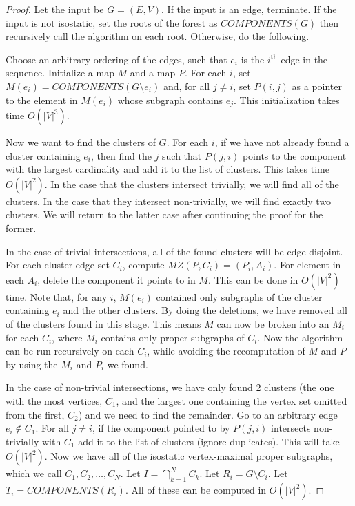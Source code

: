 \begin{proof}
    Let the input be $G=(E,V)$. If the input is an edge, terminate. If the input is not isostatic, set the roots of the forest as $COMPONENTS(G)$ then recursively call the algorithm on each root. Otherwise, do the following.

    Choose an arbitrary ordering of the edges, such that $e_i$ is the $i^\text{th}$ edge in the sequence.
    Initialize a map $M$ and a map $P$. For each $i$, set $M(e_i)=COMPONENTS(G\setminus e_i)$ and, for all $j\neq i$, set $P(i,j)$ as a pointer to the element in $M(e_i)$ whose subgraph contains $e_j$. This initialization takes time $O(|V|^3)$.


    Now we want to find the clusters of $G$.
    For each $i$, if we have not already found a cluster containing $e_i$, then find the $j$ such that $P(j,i)$ points to the component with the largest cardinality and add it to the list of clusters. This takes time $O(|V|^2)$. In the case that the clusters intersect trivially, we will find all of the clusters. In the case that they intersect non-trivially, we will find exactly two clusters. We will return to the latter case after continuing the proof for the former.

    In the case of trivial intersections, all of the found clusters will be edge-disjoint. For each cluster edge set $C_i$, compute $MZ(P, C_i)=(P_i, A_i)$. For element in each $A_i$, delete the component it points to in $M$. This can be done in $O(|V|^2)$ time.
    Note that, for any $i$, $M(e_i)$ contained only subgraphs of the cluster containing $e_i$ and the other clusters. By doing the deletions, we have removed all of the clusters found in this stage. This means $M$ can now be broken into an $M_i$ for each $C_i$, where $M_i$ contains only proper subgraphs of $C_i$. Now the algorithm can be run recursively on each $C_i$, while avoiding the recomputation of $M$ and $P$ by using the $M_i$ and $P_i$ we found.

    In the case of non-trivial intersections, we have only found 2 clusters (the one with the most vertices, $C_1$, and the largest one containing the vertex set omitted from the first, $C_2$) and we need to find the remainder. Go to an arbitrary edge $e_i\notin C_1$. For all $j\neq i$, if the component pointed to by $P(j,i)$ intersects non-trivially with $C_1$ add it to the list of clusters (ignore duplicates). This will take $O(|V|^2)$. Now we have all of the isostatic vertex-maximal proper subgraphs, which we call $C_1, C_2, \ldots , C_N$. Let $I=\bigcap_{k=1}^{N}{C_k}$. Let $R_i = G\setminus C_i$.
    Let $T_i = COMPONENTS(R_i)$. All of these can be computed in $O(|V|^2)$.


\end{proof}
